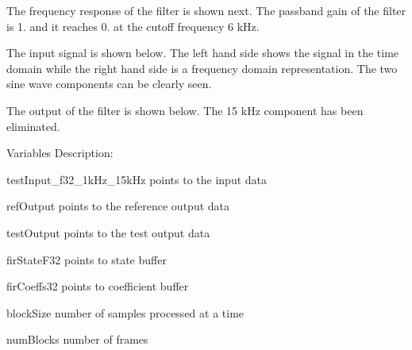 \begin{DoxyParagraph}{}
 
\end{DoxyParagraph}
\begin{DoxyParagraph}{}
The frequency response of the filter is shown next. The passband gain of the filter is 1. and it reaches 0. at the cutoff frequency 6 k\-Hz. 
\end{DoxyParagraph}
\begin{DoxyParagraph}{}
 
\end{DoxyParagraph}
\begin{DoxyParagraph}{}
The input signal is shown below. The left hand side shows the signal in the time domain while the right hand side is a frequency domain representation. The two sine wave components can be clearly seen. 
\end{DoxyParagraph}
\begin{DoxyParagraph}{}
 
\end{DoxyParagraph}
\begin{DoxyParagraph}{}
The output of the filter is shown below. The 15 k\-Hz component has been eliminated. 
\end{DoxyParagraph}
\begin{DoxyParagraph}{}

\end{DoxyParagraph}
\begin{DoxyParagraph}{Variables Description\-:}

\end{DoxyParagraph}
\begin{DoxyParagraph}{}
\begin{DoxyItemize}
\item {\ttfamily test\-Input\-\_\-f32\-\_\-1k\-Hz\-\_\-15k\-Hz} points to the input data \item {\ttfamily ref\-Output} points to the reference output data \item {\ttfamily test\-Output} points to the test output data \item {\ttfamily fir\-State\-F32} points to state buffer \item {\ttfamily fir\-Coeffs32} points to coefficient buffer \item {\ttfamily block\-Size} number of samples processed at a time \item {\ttfamily num\-Blocks} number of frames\end{DoxyItemize}

\end{DoxyParagraph}
